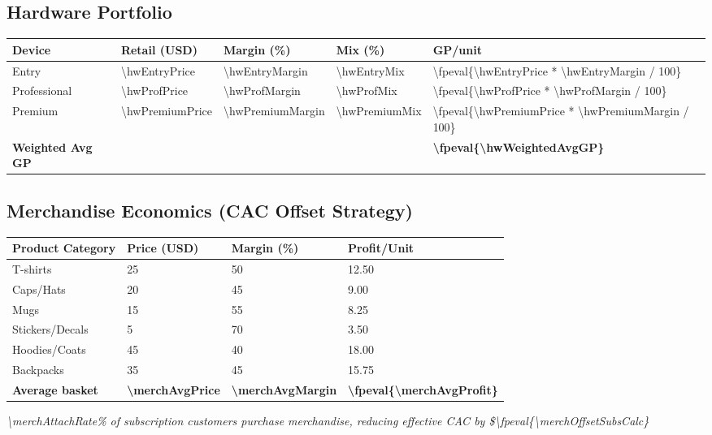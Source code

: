 \documentclass[11pt]{article}
\newcommand{\numfpeval}[1]{\num{\fpeval{#1}}}
\begin{document}
\subsection{Hardware Portfolio}
\begin{table}[H]
\centering
\begin{tabularx}{\linewidth}{l Y Y Y Y}
\toprule
Device & Retail (USD) & Margin (\%)\cite{industrybenchmark2024} & Mix (\%) & GP/unit \\\midrule
Entry        & \num{\hwEntryPrice}  & \num{\hwEntryMargin} & \num{\hwEntryMix} & \numfpeval{\hwEntryPrice * \hwEntryMargin / 100} \\
Professional & \num{\hwProfPrice} & \num{\hwProfMargin} & \num{\hwProfMix} & \numfpeval{\hwProfPrice * \hwProfMargin / 100} \\
Premium      & \num{\hwPremiumPrice} & \num{\hwPremiumMargin} & \num{\hwPremiumMix} & \numfpeval{\hwPremiumPrice * \hwPremiumMargin / 100} \\\midrule
\textbf{Weighted Avg GP} &  &  &  & \textbf{\numfpeval{\hwWeightedAvgGP}} \\
\bottomrule
\end{tabularx}
\end{table}

\subsection{Merchandise Economics (CAC Offset Strategy)}
\begin{table}[H]
\centering
\begin{tabularx}{\linewidth}{l Y Y Y}
\toprule
Product Category & Price (USD) & Margin (\%)\cite{printful2023} & Profit/Unit \\\midrule
T-shirts & \num{25} & \num{50} & \num{12.50} \\
Caps/Hats & \num{20} & \num{45} & \num{9.00} \\
Mugs & \num{15} & \num{55} & \num{8.25} \\
Stickers/Decals & \num{5} & \num{70} & \num{3.50} \\
Hoodies/Coats & \num{45} & \num{40} & \num{18.00} \\
Backpacks & \num{35} & \num{45} & \num{15.75} \\\midrule
\textbf{Average basket} & \textbf{\num{\merchAvgPrice}} & \textbf{\num{\merchAvgMargin}} & \textbf{\numfpeval{\merchAvgProfit}} \\
\bottomrule
\end{tabularx}
\end{table}
\textit{\num{\merchAttachRate}\% of subscription customers purchase merchandise, reducing effective CAC by \$\numfpeval{\merchOffsetSubsCalc}}\cite{shopify2024}
\end{document}
